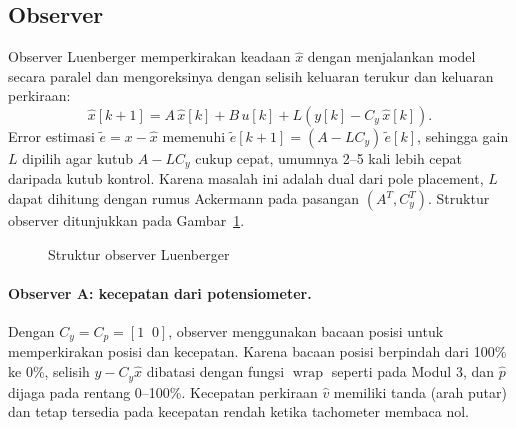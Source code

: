 \documentclass[11pt,a4paper]{article}
\begin{document}
\subsection{Observer}
Observer Luenberger memperkirakan keadaan $\hat{x}$ dengan menjalankan model secara paralel dan mengoreksinya dengan selisih keluaran terukur dan keluaran perkiraan:
\begin{equation}
\hat{x}[k+1] = A\,\hat{x}[k] + B\,u[k] + L\left(y[k] - C_y\,\hat{x}[k]\right).
\label{eq:observer}
\end{equation}
Error estimasi $\tilde{e} = x - \hat{x}$ memenuhi $\tilde{e}[k+1] = (A - L C_y)\,\tilde{e}[k]$, sehingga gain $L$ dipilih agar kutub $A - LC_y$ cukup cepat, umumnya 2--5 kali lebih cepat daripada kutub kontrol. Karena masalah ini adalah dual dari pole placement, $L$ dapat dihitung dengan rumus Ackermann pada pasangan $(A^T, C_y^T)$. Struktur observer ditunjukkan pada Gambar~\ref{fig:observer}.

\begin{figure}[H]
\centering
{}
\caption{Struktur observer Luenberger}
\label{fig:observer}
\end{figure}

\paragraph{Observer A: kecepatan dari potensiometer.} Dengan $C_y = C_p = [1\;\;0]$, observer menggunakan bacaan posisi untuk memperkirakan posisi dan kecepatan. Karena bacaan posisi berpindah dari 100\% ke 0\%, selisih $y - C_y\hat{x}$ dibatasi dengan fungsi $\operatorname{wrap}$ seperti pada Modul 3, dan $\hat{p}$ dijaga pada rentang 0--100\%. Kecepatan perkiraan $\hat{v}$ memiliki tanda (arah putar) dan tetap tersedia pada kecepatan rendah ketika tachometer membaca nol.
\end{document}
